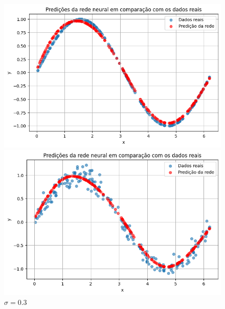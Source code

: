 \begin{figure}[htb]
	\centering
	\begin{minipage}{0.45\textwidth}
		\centering
		\caption{$\sigma=0.0$}\label{fig:tarefa05:00:predicoes}
		
		\includegraphics[width=\textwidth]{./0803_imgs/0365_tarefa05/png-241110-192904307-9336339325602212821.png}
	\end{minipage}
	\hfill
	\begin{minipage}{0.45\textwidth}
		\centering
		\caption{$\sigma=0.1$}\label{fig:tarefa05:01:predicoes}
		
		\includegraphics[width=\textwidth]{./0803_imgs/0365_tarefa05/png-241110-192925288-2928491021629715945.png}
	\end{minipage}
	\vspace{2Ex}
	\begin{minipage}{0.45\textwidth}
		\centering
		\caption{$\sigma=0.3$}\label{fig:tarefa05:03:predicoes}
		

\end{minipage}
\end{figure}
